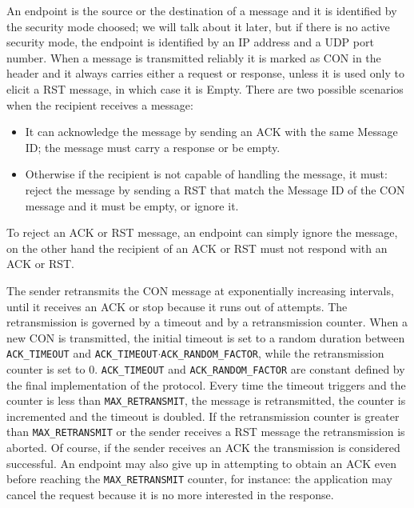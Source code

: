 	An endpoint is the source or the destination of a message and it is identified by the security mode choosed; we will talk about it later, but if there is no active security mode, the endpoint is identified by an IP address and a UDP port number.\newline
	When a message is transmitted reliably it is marked as CON in the header and it always carries either a request or response, unless it is used only to elicit a RST message, in which case it is Empty.\newline
	There are two possible scenarios when the recipient receives a message:\newline
		\begin{itemize}
		\item It can acknowledge the message by sending an ACK with the same Message ID; the message must carry a response or be empty.
		\item Otherwise if the recipient is not capable of handling the message, it must: reject the message by sending a RST that match the Message ID of the CON message and it must be empty, or ignore it.
	\end{itemize}

	To reject an ACK or RST message, an endpoint can simply ignore the message, on the other hand
	the recipient of an ACK or RST must not respond with an ACK or RST.\newline
	
	The sender retransmits the CON message at exponentially increasing intervals, 
	until it receives an ACK or stop because it runs out of attempts.\newline
	The retransmission is governed by a timeout and by a retransmission counter.\newline
	When a new CON is transmitted, the initial timeout is set to a random duration between
	\texttt{ACK\_TIMEOUT} 
	and \texttt{ACK\_TIMEOUT$\cdot$ACK\_RANDOM\_FACTOR}, while the retransmission counter is set to 0.\newline
	\texttt{ACK\_TIMEOUT} and \texttt{ACK\_RANDOM\_FACTOR} are constant defined by the final implementation of the protocol.\newline
	Every time the timeout triggers and the counter is less than \texttt{MAX\_RETRANSMIT}, the message is retransmitted, the counter is incremented and the timeout is doubled.\newline
	If the retransmission counter is greater than \texttt{MAX\_RETRANSMIT} or the sender receives a RST message the retransmission is aborted.\newline
	Of course, if the sender receives an ACK the transmission is considered successful.\newline
	An endpoint may also give up in attempting to obtain an ACK even before reaching the \texttt{MAX\_RETRANSMIT} counter, for instance: the application may cancel the request because it is no more interested in the response.\newline
	
